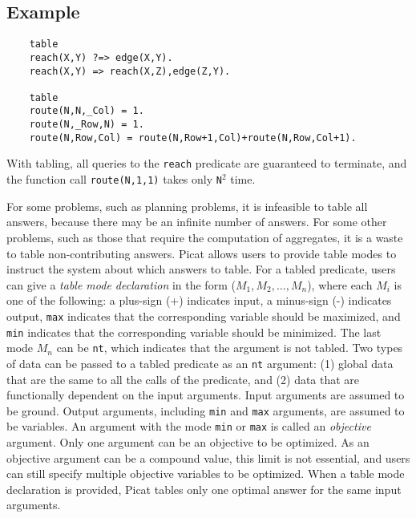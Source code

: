 \subsection*{Example}
\begin{verbatim}
    table
    reach(X,Y) ?=> edge(X,Y).
    reach(X,Y) => reach(X,Z),edge(Z,Y).

    table
    route(N,N,_Col) = 1.
    route(N,_Row,N) = 1.
    route(N,Row,Col) = route(N,Row+1,Col)+route(N,Row,Col+1).
\end{verbatim}
With tabling, all queries to the \texttt{reach} predicate are guaranteed to terminate, and the function call \texttt{route(N,1,1)} takes only \texttt{N}$^2$ time.

For some problems, such as planning problems, it is infeasible to table all answers, because there may be an infinite number of answers. For some other problems, such as those that require the computation of aggregates, it is a waste to table non-contributing answers. Picat allows users to provide table modes to instruct the system about which answers to table. For a tabled predicate, users can give a \emph{table mode declaration} in the form ($M_{1},M_{2},\ldots,M_{n}$), where each $M_{i}$ is one of the following: a plus-sign (+) indicates input, a minus-sign (-) indicates output, \texttt{max} indicates that the corresponding variable should be maximized, and \texttt{min} indicates that the corresponding variable should be minimized. The last mode $M_{n}$ can be \texttt{nt}, which indicates that the argument is not tabled. Two types of data can be passed to a tabled predicate as an \texttt{nt} argument: (1) global data that are the same to all the calls of the predicate, and (2) data that are functionally dependent on the input arguments. Input arguments are assumed to be ground.  Output arguments, including \texttt{min} and \texttt{max} arguments, are assumed to be variables. An argument with the mode \texttt{min} or \texttt{max} is called an \emph{objective} argument. Only one argument can be an objective to be optimized. As an objective argument can be a compound value, this limit is not essential, and users can still specify multiple objective variables to be optimized. When a table mode declaration is provided, Picat tables only one optimal answer for the same input arguments.

